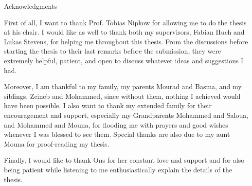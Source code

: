 \thispagestyle{empty}

\vspace*{20mm}

\begin{center}
{ Acknowledgments}
\end{center}

\vspace{10mm}

First of all, I want to thank Prof. Tobias Nipkow for allowing me to do the thesis at his chair.
I would like as well to thank both my supervisors, Fabian Huch and Lukas Stevens, for
helping me throughout this thesis. From the discussions before starting the thesis to their
last remarks before the submission, they were extremely helpful, patient, and open to discuss
whatever ideas and suggestions I had.

Moreover, I am thankful to my family, my parents Mourad and Basma, and my siblings, Zeineb
and Mohammed, since without them, nothing I achieved would have been possible. I also want
to thank my extended family for their encouragement and support, especially my Grandparents Mohammed and
Saloua, and Mohammed and Mouna, for flooding me with prayers and good wishes whenever I was blessed to see them. Special thanks are also due to my aunt Mouna for proof-reading my thesis.

Finally, I would like to thank Ons for her constant love and support and for also
being patient while listening to me enthusiastically explain the details of the thesis. 

\cleardoublepage{}
